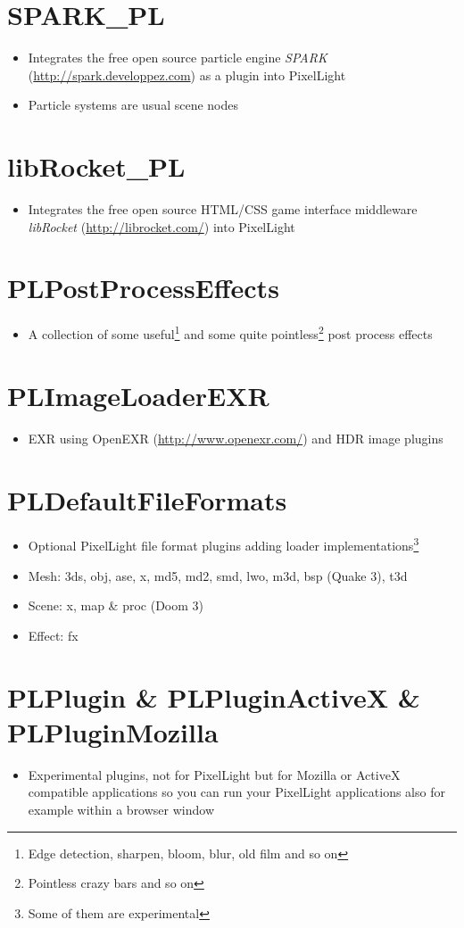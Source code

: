 \section{SPARK\_PL}
\begin{itemize}
\item{Integrates the free open source particle engine \emph{SPARK} (\url{http://spark.developpez.com}) as a plugin into PixelLight}
\item{Particle systems are usual scene nodes}
\end{itemize}




\section{libRocket\_PL}
\begin{itemize}
\item{Integrates the free open source HTML/CSS game interface middleware \emph{libRocket} (\url{http://librocket.com/}) into PixelLight}
\end{itemize}




\section{PLPostProcessEffects}
\begin{itemize}
\item{A collection of some useful\footnote{Edge detection, sharpen, bloom, blur, old film and so on} and some quite pointless\footnote{Pointless crazy bars and so on} post process effects}
\end{itemize}




\section{PLImageLoaderEXR}
\begin{itemize}
\item{EXR using OpenEXR (\url{http://www.openexr.com/}) and HDR image plugins}
\end{itemize}




\section{PLDefaultFileFormats}
\begin{itemize}
\item{Optional PixelLight file format plugins adding loader implementations\footnote{Some of them are experimental}}
\item{Mesh: 3ds, obj, ase, x, md5, md2, smd, lwo, m3d, bsp (Quake 3), t3d}
\item{Scene: x, map \& proc (Doom 3)}
\item{Effect: fx}
\end{itemize}




\section{PLPlugin \& PLPluginActiveX \& PLPluginMozilla}
\begin{itemize}
\item{Experimental plugins, not for PixelLight but for Mozilla or ActiveX compatible applications so you can run your PixelLight applications also for example within a browser window}
\end{itemize}
